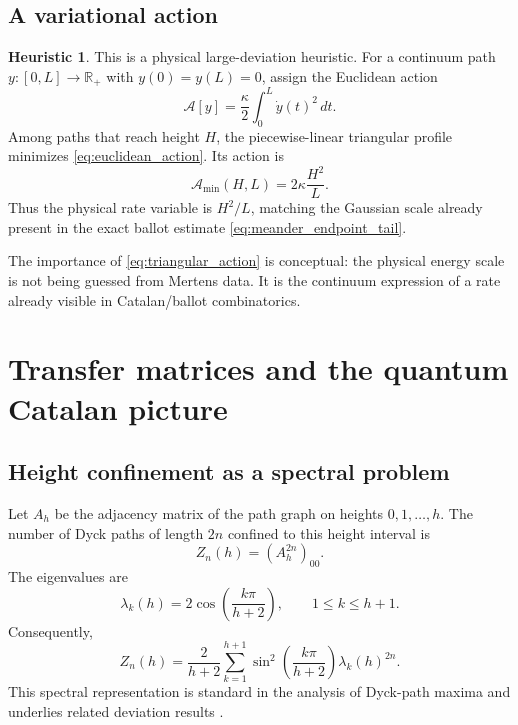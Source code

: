 \documentclass[11pt]{amsart}
\numberwithin{equation}{section}
\theoremstyle{plain}
\theoremstyle{definition}
\newtheorem{heuristic}[theorem]{Heuristic}
\theoremstyle{remark}
\newcommand{\R}{\mathbb{R}}
\begin{document}
\subsection{A variational action}
\label{subsec:variational_action}

\begin{heuristic}
\label{heur:brownian_action}
This is a physical large-deviation heuristic.  For a continuum path $y:[0,L]\to\R_+$ with $y(0)=y(L)=0$, assign the Euclidean action
\begin{equation}
\mathcal{A}[y]
=
\frac{\kappa}{2}
\int_0^L \dot y(t)^2\,dt.
\label{eq:euclidean_action}
\end{equation}
Among paths that reach height $H$, the piecewise-linear triangular profile minimizes \eqref{eq:euclidean_action}.  Its action is
\begin{equation}
\mathcal{A}_{\min}(H,L)
=
2\kappa\frac{H^2}{L}.
\label{eq:triangular_action}
\end{equation}
Thus the physical rate variable is $H^2/L$, matching the Gaussian scale already present in the exact ballot estimate \eqref{eq:meander_endpoint_tail}.
\end{heuristic}

The importance of \eqref{eq:triangular_action} is conceptual: the physical energy scale is not being guessed from Mertens data.  It is the continuum expression of a rate already visible in Catalan/ballot combinatorics.

\section{Transfer matrices and the quantum Catalan picture}
\label{sec:transfer_quantum}

\subsection{Height confinement as a spectral problem}
\label{subsec:height_spectral}

Let $A_h$ be the adjacency matrix of the path graph on heights $0,1,\ldots,h$.  The number of Dyck paths of length $2n$ confined to this height interval is
\begin{equation}
Z_n(h)=(A_h^{2n})_{00}.
\label{eq:confined_partition_function}
\end{equation}
The eigenvalues are
\begin{equation}
\lambda_k(h)
=
2\cos\!\left(\frac{k\pi}{h+2}\right),
\qquad
1\le k\le h+1.
\label{eq:path_graph_eigenvalues}
\end{equation}
Consequently,
\begin{equation}
Z_n(h)
=
\frac{2}{h+2}
\sum_{k=1}^{h+1}
\sin^2\!\left(\frac{k\pi}{h+2}\right)
\lambda_k(h)^{2n}.
\label{eq:confined_spectral_sum}
\end{equation}
This spectral representation is standard in the analysis of Dyck-path maxima and underlies related deviation results \cite{Kousha2012}.
\end{document}
